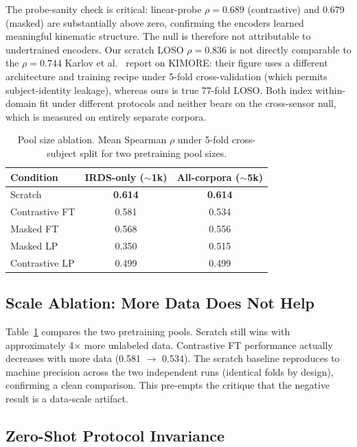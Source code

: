 \documentclass[10pt,journal]{IEEEtran}
\begin{document}
The probe-sanity check is critical: linear-probe $\rho = 0.689$ (contrastive) and $0.679$ (masked) are substantially above zero, confirming the encoders learned meaningful kinematic structure. The null is therefore not attributable to undertrained encoders. Our scratch LOSO $\rho = 0.836$ is not directly comparable to the $\rho = 0.744$ Karlov et al.\ \cite{karlov2024} report on KIMORE: their figure uses a different architecture and training recipe under 5-fold cross-validation (which permits subject-identity leakage), whereas ours is true 77-fold LOSO. Both index within-domain fit under different protocols and neither bears on the cross-sensor null, which is measured on entirely separate corpora.

\begin{table}[t]
\centering
\caption{Pool size ablation. Mean Spearman $\rho$ under 5-fold cross-subject split for two pretraining pool sizes.}
\label{tab:pool}
\begin{tabular}{lcc}
\toprule
Condition & IRDS-only ($\sim$1k) & All-corpora ($\sim$5k) \\
\midrule
Scratch         & \textbf{0.614} & \textbf{0.614} \\
Contrastive FT  & 0.581          & 0.534 \\
Masked FT       & 0.568          & 0.556 \\
Masked LP       & 0.350          & 0.515 \\
Contrastive LP  & 0.499          & 0.499 \\
\bottomrule
\end{tabular}
\end{table}

\subsection{Scale Ablation: More Data Does Not Help}
\label{sec:scale}

Table~\ref{tab:pool} compares the two pretraining pools. Scratch still wins with approximately 4$\times$ more unlabeled data. Contrastive FT performance actually decreases with more data (0.581 $\to$ 0.534). The scratch baseline reproduces to machine precision across the two independent runs (identical folds by design), confirming a clean comparison. This pre-empts the critique that the negative result is a data-scale artifact.

\subsection{Zero-Shot Protocol Invariance}
\label{sec:protocol-invariance}
\end{document}
